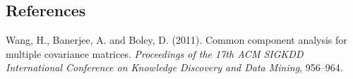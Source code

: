 \documentclass[12pt]{article}
\begin{document}
%
%
%

\subsection*{References}

\begin{description}
\item
Wang, H., Banerjee, A. and Boley, D. (2011). 
Common component analysis for multiple covariance matrices. 
\textit{Proceedings of the 17th ACM SIGKDD International Conference on Knowledge Discovery and Data Mining}, 956--964.
\end{description}
\end{document}
